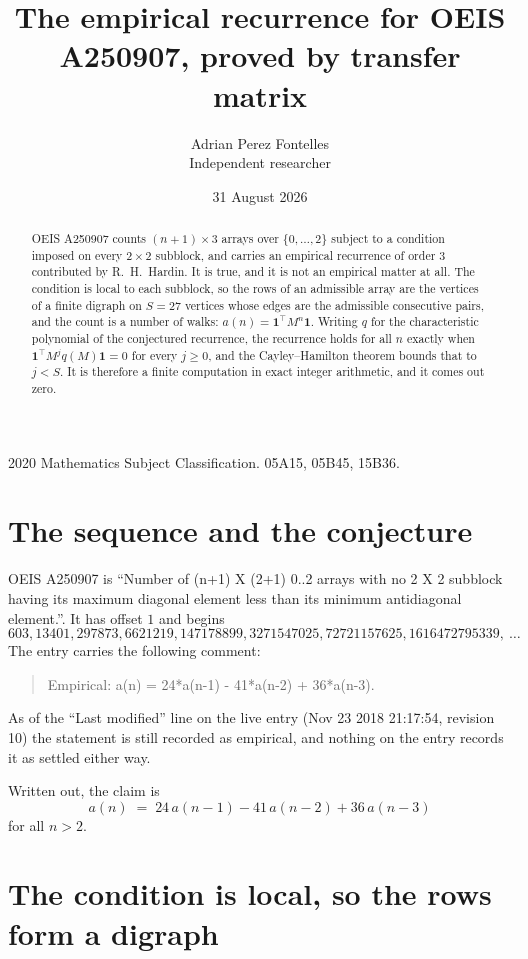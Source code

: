 \documentclass[11pt,a4paper]{article}
\title{The empirical recurrence for OEIS A250907, proved by transfer matrix}
\author{Adrian Perez Fontelles\\ \small Independent researcher}
\date{31 August 2026}
\theoremstyle{plain}
\theoremstyle{definition}
\begin{document}
\maketitle

\begin{abstract}
OEIS A250907 counts $(n+1)\times3$ arrays over $\{0,\dots,2\}$ subject to a condition imposed on
every $2\times2$ subblock, and carries an empirical recurrence of order $3$ contributed
by R.~H.~Hardin. It is true, and it is not an empirical matter at all. The condition is local
to each subblock, so the rows of an admissible array are the vertices of a finite digraph
on $S=27$ vertices whose edges are the admissible consecutive pairs, and the count is a
number of walks: $a(n)=\mathbf{1}^{\!\top}M^{n}\mathbf{1}$. Writing $q$
for the characteristic polynomial of the conjectured recurrence, the recurrence holds for all
$n$ exactly when $\mathbf{1}^{\!\top}M^{j}q(M)\mathbf{1}=0$ for every $j\ge0$, and the
Cayley--Hamilton theorem bounds that to $j<S$. It is therefore a finite computation in exact
integer arithmetic, and it comes out zero.
\end{abstract}

\noindent\small 2020 Mathematics Subject Classification. 05A15, 05B45, 15B36.\normalsize

\section{The sequence and the conjecture}

OEIS A250907 is ``Number of (n+1) X (2+1) 0..2 arrays with no 2 X 2 subblock having its maximum diagonal element less than its minimum antidiagonal element.''. It has offset $1$ and begins
\[
603, 13401, 297873, 6621219, 147178899, 3271547025, 72721157625, 1616472795339,\ \dots
\]
The entry carries the following comment:
\begin{quote}\small
Empirical: a(n) = 24*a(n-1) - 41*a(n-2) + 36*a(n-3).
\end{quote}
As of the ``Last modified'' line on the live entry (Nov 23 2018 21:17:54, revision 10) the statement is
still recorded as empirical, and nothing on the entry records it as settled either way.

Written out, the claim is
\begin{equation}\label{eq:conj}
a(n)\;=\;24\,a(n-1) - 41\,a(n-2) + 36\,a(n-3)
\end{equation}
for all $n>2$.

\section{The condition is local, so the rows form a digraph}
\end{document}

